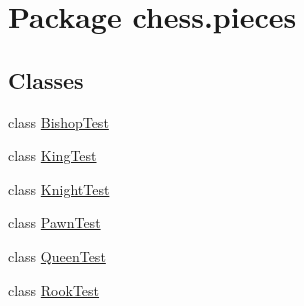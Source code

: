 \hypertarget{namespacechess_1_1pieces}{}\section{Package chess.\+pieces}
\label{namespacechess_1_1pieces}
\subsection*{Classes}
\begin{DoxyCompactItemize}
\item 
class \mbox{\hyperlink{classchess_1_1pieces_1_1_bishop_test}{Bishop\+Test}}
\item 
class \mbox{\hyperlink{classchess_1_1pieces_1_1_king_test}{King\+Test}}
\item 
class \mbox{\hyperlink{classchess_1_1pieces_1_1_knight_test}{Knight\+Test}}
\item 
class \mbox{\hyperlink{classchess_1_1pieces_1_1_pawn_test}{Pawn\+Test}}
\item 
class \mbox{\hyperlink{classchess_1_1pieces_1_1_queen_test}{Queen\+Test}}
\item 
class \mbox{\hyperlink{classchess_1_1pieces_1_1_rook_test}{Rook\+Test}}
\end{DoxyCompactItemize}
